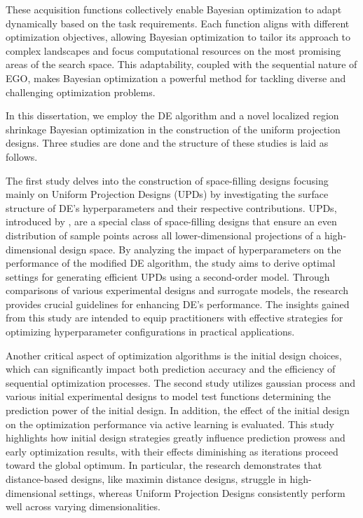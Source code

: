 These acquisition functions collectively enable Bayesian optimization to adapt dynamically based on the task requirements. Each function aligns with different optimization objectives, allowing Bayesian optimization to tailor its approach to complex landscapes and focus computational resources on the most promising areas of the search space. This adaptability, coupled with the sequential nature of EGO, makes Bayesian optimization a powerful method for tackling diverse and challenging optimization problems.

In this dissertation, we employ the DE algorithm and a novel localized region shrinkage Bayesian optimization in the construction of the uniform projection designs. Three studies are done and the structure of these studies is laid as follows.

The first study delves into the construction of space-filling designs focusing mainly on Uniform Projection Designs (UPDs) by investigating the surface structure of DE's hyperparameters and their respective contributions. {UPDs, introduced by \textcite{sun2019uniform}, are a special class of space-filling designs} that ensure an even distribution of sample points across all lower-dimensional projections of a high-dimensional design space. By analyzing the impact of hyperparameters on the performance of the modified DE algorithm, the study aims to derive optimal settings for generating {efficient UPDs} using a second-order model. Through comparisons of various experimental designs and surrogate models, the research provides crucial guidelines for enhancing DE's performance. The insights gained from this study are intended to equip practitioners with effective strategies for optimizing hyperparameter configurations in practical applications.

Another critical aspect of optimization algorithms is the initial design choices, which can significantly impact both prediction accuracy and the efficiency of sequential optimization processes. The second study utilizes gaussian process and various initial experimental designs to model test functions determining the prediction power of the initial design. In addition, {the effect of the initial design on the optimization performance via active learning}  is evaluated. This study highlights how initial design strategies greatly influence prediction prowess and early optimization results, with their effects diminishing as iterations proceed toward the global optimum. In particular, the research demonstrates that distance-based designs, like {maximin distance designs}, struggle in high-dimensional settings, whereas Uniform Projection Designs consistently perform well across varying dimensionalities.

